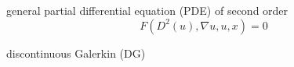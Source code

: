 
general partial differential equation (PDE) of second order
\[
	F(D^2(u), \nabla u, u, x) = 0
\]

\begin{definition}
	
\end{definition}

discontinuous Galerkin (DG)

